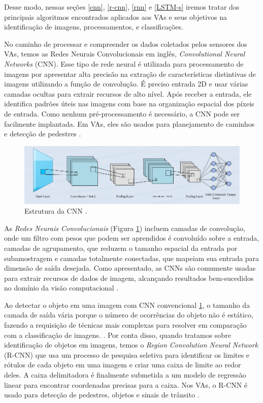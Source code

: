 Desse modo, nessas seções \ref{cnn}, \ref{r-cnn}, \ref{rnn} e \ref{LSTM-s} iremos tratar dos principais algoritmos encontrados aplicados aos VAs e seus objetivos na identificação de imagens, processamentos, e classificações.

 \label{cnn}

No caminho de processar e compreender os dados coletados pelos sensores dos VAs, temos as Redes Neurais Convolucionais em inglês, \textit{Convolutional Neural Networks} (CNN). Esse tipo de rede neural é utilizada para processamento de imagens por apresentar alta precisão na extração de características distintivas de imagens utilizando a função de convolução. É preciso entrada 2D e usar várias camadas ocultas para extrair recursos de alto nível. Após receber a entrada, ele identifica padrões úteis nas imagens com base na organização espacial dos píxeis de entrada. Como nenhum pré-processamento é necessário, a CNN pode ser facilmente implantada. Em VAs, eles são usados para planejamento de caminhos e detecção de pedestres \cite{review-auto}.

\begin{figure}[H]
\centering
\includegraphics[width=\textwidth]{Figures/CNN.png}
\caption{Estrutura da CNN \cite{software-cnn}.}
\label{CNN}
\end{figure}

As \textit{Redes Neurais Convolucionais} (Figura \ref{CNN}) incluem camadas de convolução, onde um filtro com pesos que podem ser aprendidos é convoluído sobre a entrada, camadas de agrupamento, que reduzem o tamanho espacial da entrada por subamostragem e camadas totalmente conectadas, que mapeiam sua entrada para dimensão de saída desejada. Como apresentado, as CNNs são comumente usadas para extrair recursos de dados de imagem, alcançando resultados bem-sucedidos no domínio da visão computacional \cite{software-review}.

 \label{r-cnn}

Ao detectar o objeto em uma imagem com CNN convencional \ref{CNN}, o tamanho da camada de saída vária porque o número de ocorrências do objeto não é estático, fazendo a requisição de técnicas mais complexas para resolver em comparação com a classificação de imagens. \cite{software-cnn}.
Por conta disso, quando tratamos sobre identificação de objetos em imagens, temos o \textit{Region Convolution Neural Network} (R-CNN) que usa um processo de pesquisa seletiva para identificar os limites e rótulos de cada objeto em uma imagem e criar uma caixa de limite ao redor deles. A caixa delimitadora é finalmente submetida a um modelo de regressão linear para encontrar coordenadas precisas para a caixa. Nos VAs, o R-CNN é usado para detecção de pedestres, objetos e sinais de trânsito \cite{review-auto}.


